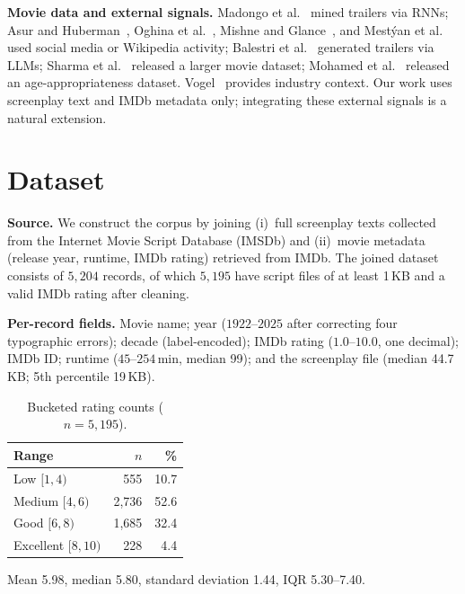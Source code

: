 \documentclass[runningheads]{llncs}
\begin{document}
\noindent\textbf{Movie data and external signals.}
Madongo et al.~\cite{ref16} mined trailers via RNNs;
Asur and Huberman~\cite{ref21}, Oghina et al.~\cite{ref22},
Mishne and Glance~\cite{ref23}, and Mest{\'y}an et
al.~\cite{ref24} used social media or Wikipedia activity;
Balestri et al.~\cite{ref31} generated trailers via LLMs;
Sharma et al.~\cite{ref32} released a larger movie dataset;
Mohamed et al.~\cite{ref34} released an age-appropriateness
dataset. Vogel~\cite{ref25} provides industry context. Our work
uses screenplay text and IMDb metadata only; integrating these
external signals is a natural extension.

\section{Dataset}

\noindent\textbf{Source.}
We construct the corpus by joining (i)~full screenplay texts
collected from the Internet Movie Script Database (IMSDb) and
(ii)~movie metadata (release year, runtime, IMDb rating) retrieved
from IMDb. The joined dataset consists of $5{,}204$ records, of
which $5{,}195$ have script files of at least 1\,KB and a valid
IMDb rating after cleaning.

\noindent\textbf{Per-record fields.}
Movie name; year ($1922$--$2025$ after correcting four typographic
errors); decade (label-encoded); IMDb rating ($1.0$--$10.0$, one
decimal); IMDb ID; runtime ($45$--$254$\,min, median 99); and the
screenplay file (median 44.7\,KB; 5th percentile 19\,KB).

\begin{table}[t]
\caption{Bucketed rating counts ($n = 5{,}195$).}\label{tab:buckets}
\centering
\begin{tabular}{@{}lrr@{}}
\toprule
Range & $n$ & \% \\
\midrule
Low $[1, 4)$        & 555    & 10.7 \\
Medium $[4, 6)$     & 2{,}736 & 52.6 \\
Good $[6, 8)$       & 1{,}685 & 32.4 \\
Excellent $[8, 10)$ & 228    & 4.4 \\
\bottomrule
\end{tabular}
\end{table}

Mean 5.98, median 5.80, standard deviation 1.44, IQR 5.30--7.40.
\end{document}
